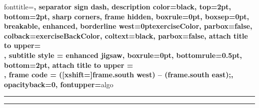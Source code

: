     {fonttitle=\sffamily\bfseries\color{black},
        separator sign dash, description color=black,
        top=2pt, bottom=2pt,
        sharp corners,
        frame hidden, boxrule=0pt, boxsep=0pt, breakable,
        enhanced, borderline west={\the\tcbBorderWidth}{0pt}{exerciseColor},
        parbox=false,
        colback=exerciseBackColor,
        coltext=black,
        parbox=false,
        attach title to upper={\\},
        subtitle style = {enhanced jigsaw, boxrule=0pt, bottomrule=0.5pt, bottom=2pt,
        attach title to upper = {\\},
        frame code = { ([xshift=\the\tcbBorderWidth]frame.south west) -- (frame.south east);},
opacityback=0, fontupper=\color{black}}}{algo}
{\begin{tcbalgo}{#1}{#2}}{\end{tcbalgo}}
{\begin{tcbalgo*}{#1}{#2}}{\end{tcbalgo*}}




\makeatletter
\renewenvironment{proof}[1][\proofname]{\par
\pushQED{\qed}%
\normalfont \topsep6\p@\@plus6\p@\relax
\trivlist
\item[\hskip\labelsep
\itshape
#1\@addpunct{.}]
\leavevmode}{%
\popQED\endtrivlist\@endpefalse
}
\makeatother

\newcommand{\slide}[1]{\subsubsection{#1}}


{\vspace{5pt}\begin{center}\rule{0.9\textwidth}{1pt}\end{center}\lstset{language=Python,linewidth=0.9\linewidth,xleftmargin=0.1\linewidth}}
{\vspace{-10pt}\begin{center}\rule{0.9\textwidth}{1pt}\end{center}}
\newcommand{\pythoncode}[1]{\lstinline[language=Python]{#1}}
\newcommand{\code}[1]{\texttt{#1}}
